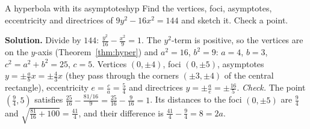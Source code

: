 \documentclass[11pt]{article}
\begin{document}
\begin{exmp}{A hyperbola with its asymptotes}{hyp}
Find the vertices, foci, asymptotes, eccentricity and directrices of $9y^2-16x^2=144$ and sketch it. Check a point.

\textbf{Solution.} Divide by $144$: $\frac{y^2}{16}-\frac{x^2}9=1$. The $y^2$-term is positive, so the vertices are on the $y$-axis (Theorem~\ref{thm:hyper}) and $a^2=16$, $b^2=9$: $a=4$, $b=3$, $c^2=a^2+b^2=25$, $c=5$. Vertices $(0,\pm4)$, foci $(0,\pm5)$, asymptotes $y=\pm\frac abx=\pm\frac43x$ (they pass through the corners $(\pm3,\pm4)$ of the central rectangle), eccentricity $e=\frac ca=\frac54$ and directrices $y=\pm\frac ae=\pm\frac{16}5$.
\emph{Check.} The point $\left(\frac94,5\right)$ satisfies $\frac{25}{16}-\frac{81/16}9=\frac{25}{16}-\frac9{16}=1$. Its distances to the foci $(0,\pm5)$ are $\frac94$ and $\sqrt{\frac{81}{16}+100}=\frac{41}4$, and their difference is $\frac{41}4-\frac94=8=2a$.


\end{exmp}
\end{document}
